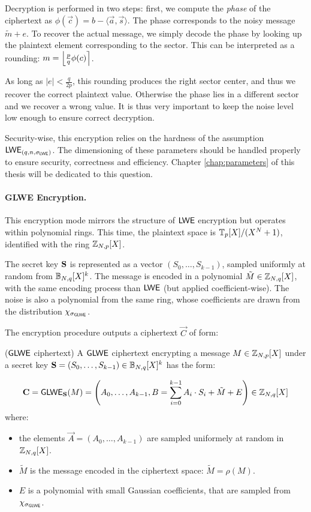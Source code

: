 Decryption is performed in two steps: first, we compute the \emph{phase} of the ciphertext as $\phi(\vec c) = b - \langle \vec a, \vec s\rangle$. The phase corresponds to the noisy message $\tilde{m} + e$. To recover the actual message, we simply decode the phase by looking up the plaintext element corresponding to the sector. This can be interpreted as a rounding: $m = \left \lfloor \frac p q \phi(c) \right \rceil$. 

As long as $|e| < \frac{q}{2p}$, this rounding produces the right sector center, and thus we recover the correct plaintext value. Otherwise the phase lies in a different sector and we recover a wrong value. It is thus very important to keep the noise level low enough to ensure correct decryption.


Security-wise, this encryption relies on the hardness of the assumption $\textsf{LWE}_{(q, n, \sigma_{\textsf{LWE}})}$. The dimensioning of these parameters should be handled properly to ensure security, correctness and efficiency. Chapter \ref{chap:parameters} of this thesis will be dedicated to this question.



\paragraph{GLWE Encryption.} This encryption mode mirrors the structure of $\textsf{LWE}$ encryption but operates within polynomial rings.
This time, the plaintext space is $\mathbb{T}_p[X] / (X^N + 1)$, identified with the ring $\mathbb{Z}_{N,p}[X]$.

The secret key $\mathbf S$ is represented as a vector $(S_0, \dots, S_{k-1})$, sampled uniformly at random from $\mathbb{B}_{N, q}[X]^k$. 
%
The message is encoded in a polynomial $\tilde M \in \mathbb{Z}_{N,q}[X]$, with the same encoding process than $\textsf{LWE}$ (but applied coefficient-wise). The noise is also a polynomial from the same ring, whose coefficients are drawn from the distribution $\chi_{\sigma_{\textsf{GLWE}}}$.
%

The encryption procedure outputs a ciphertext $\vec C$ of form:


\begin{definition}($\textsf{GLWE}$ ciphertext)
	A $\textsf{GLWE}$ ciphertext encrypting a message $M \in \mathbb{Z}_{N,p}[X]$ under a secret key $\mathbf S = (S_0, \dots, S_{k-1}) \in \mathbb{B}_{N, q}[X]^k$ has the form:
	
	\begin{equation*}
		\mathbf C = \textsf{GLWE}_{\mathbf S}(M) = \left ( A_0, \dots, A_{k-1}, B = \sum_{i=0}^{k-1} A_i \cdot S_i + \tilde M + E \right ) \in \mathbb{Z}_{N,q}[X]
	\end{equation*}
	where:
	\begin{itemize}
		\item the elements $\vec A = (A_0, \dots, A_{k-1})$ are sampled uniformely at random in $\mathbb{Z}_{N,q}[X]$.
		\item $\tilde M$ is the message encoded in the ciphertext space: $\tilde M = \rho(M)$.
		\item $E$ is a polynomial with small Gaussian coefficients, that are sampled from $\chi_{\sigma_{\textsf{GLWE}}}$.
	\end{itemize}
\end{definition}



